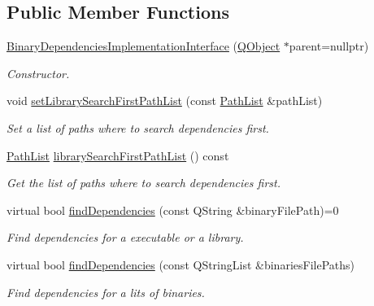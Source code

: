 \subsection*{Public Member Functions}
\begin{DoxyCompactItemize}
\item 
\hyperlink{class_mdt_1_1_deploy_utils_1_1_binary_dependencies_implementation_interface_a242781cc7706c9cee62e6fe857a90194}{Binary\+Dependencies\+Implementation\+Interface} (\hyperlink{class_q_object}{Q\+Object} $\ast$parent=nullptr)
\begin{DoxyCompactList}\small\item\em Constructor. \end{DoxyCompactList}\item 
void \hyperlink{class_mdt_1_1_deploy_utils_1_1_binary_dependencies_implementation_interface_a8b83e0f29e8e5d7e760ad4f8f4d763d4}{set\+Library\+Search\+First\+Path\+List} (const \hyperlink{class_mdt_1_1_deploy_utils_1_1_path_list}{Path\+List} \&path\+List)
\begin{DoxyCompactList}\small\item\em Set a list of paths where to search dependencies first. \end{DoxyCompactList}\item 
\hyperlink{class_mdt_1_1_deploy_utils_1_1_path_list}{Path\+List} \hyperlink{class_mdt_1_1_deploy_utils_1_1_binary_dependencies_implementation_interface_a8206539b4256a3cd2fbdcbba2930abde}{library\+Search\+First\+Path\+List} () const 
\begin{DoxyCompactList}\small\item\em Get the list of paths where to search dependencies first. \end{DoxyCompactList}\item 
virtual bool \hyperlink{class_mdt_1_1_deploy_utils_1_1_binary_dependencies_implementation_interface_adeba489faa5c76a45bbe322e814cfbc0}{find\+Dependencies} (const Q\+String \&binary\+File\+Path)=0
\begin{DoxyCompactList}\small\item\em Find dependencies for a executable or a library. \end{DoxyCompactList}\item 
virtual bool \hyperlink{class_mdt_1_1_deploy_utils_1_1_binary_dependencies_implementation_interface_a80ac2d4637c3551a186bd5afd4147390}{find\+Dependencies} (const Q\+String\+List \&binaries\+File\+Paths)
\begin{DoxyCompactList}\small\item\em Find dependencies for a lits of binaries. \end{DoxyCompactList}\item 

\end{DoxyCompactItemize}
